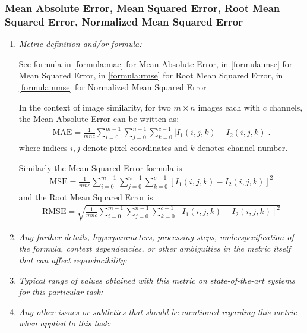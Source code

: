 \documentclass[a4paper,11pt]{article}
\begin{document}
        \subsubsection{Mean Absolute Error, Mean Squared Error, Root Mean Squared Error, Normalized Mean Squared Error}
            \begin{enumerate}[label=\alph*.]
                \item \textit{Metric definition and/or formula:}

                See formula in \ref{formula:mae} for Mean Absolute Error, in \ref{formula:mse} for Mean Squared Error, in \ref{formula:rmse} for Root Mean Squared Error, in \ref{formula:nmse} for Normalized Mean Squared Error

                In the context of image similarity, for two $m\times n$ images each with $c$ channels, the Mean Absolute Error can be written as:
                \begin{align}
                    \textrm{MAE} = \frac{1}{m n c} \sum_{i=0}^{m-1} \sum_{j=0}^{n-1} \sum_{k=0}^{c-1} \left| I_1(i, j, k) - I_2(i, j, k) \right|.
                \end{align}
                where indices $i, j$ denote pixel coordinates and $k$ denotes channel number.

                Similarly the Mean Squared Error formula is 
                \begin{align}
                    \textrm{MSE} = \frac{1}{m n c} \sum_{i=0}^{m-1} \sum_{j=0}^{n-1} \sum_{k=0}^{c-1} \left[ I_1(i, j, k) - I_2(i, j, k) \right]^2
                \end{align}
                and the Root Mean Squared Error is 
                \begin{align}
                    \textrm{RMSE} = \sqrt{ \frac{1}{m n c} \sum_{i=0}^{m-1} \sum_{j=0}^{n-1} \sum_{k=0}^{c-1} \left[ I_1(i, j, k) - I_2(i, j, k) \right]^2 }
                \end{align}

                \bigskip
                \item \textit{Any further details, hyperparameters, processing steps, underspecification of the formula, context dependencies, or other ambiguities in the metric itself that can affect reproducibility:}
                \bigskip
                \item \textit{Typical range of values obtained with this metric on state-of-the-art systems for this particular task:}
                \bigskip
                \item \textit{Any other issues or subtleties that should be mentioned regarding this metric when applied to this task:}
                \bigskip
            \end{enumerate}
\end{document}
